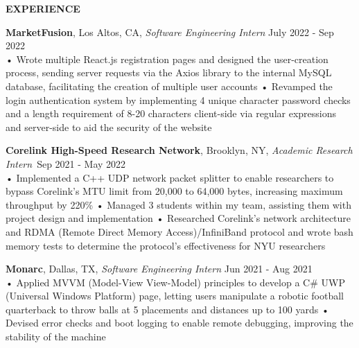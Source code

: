 \documentclass{resume} %
\begin{document}
\begin{rSection}{\textbf{EXPERIENCE}}

\textbf{MarketFusion}, Los Altos, CA, {\emph{Software Engineering Intern}} \hfill July 2022 - Sep 2022 \\
• Wrote multiple React.js registration pages and designed the user-creation process, sending server requests via the Axios library to the internal MySQL database, facilitating the creation of multiple user accounts \newline
• Revamped the login authentication system by implementing 4 unique character password checks and a length requirement of 8-20 characters client-side via regular expressions and server-side to aid the security of the website 

\textbf{Corelink High-Speed Research Network}, Brooklyn, NY, {\emph{Academic Research Intern}}\ \hfill Sep 2021 - May 2022 \\
• Implemented a C++ UDP network packet splitter to enable researchers to bypass Corelink's MTU limit from 20,000 to 64,000 bytes, increasing maximum throughput by 220\% \newline
• Managed 3 students within my team, assisting them with project design and implementation \newline
• Researched Corelink’s network architecture and RDMA (Remote Direct Memory Access)/InfiniBand protocol and wrote bash memory tests to determine the protocol's effectiveness for NYU researchers

\textbf{Monarc}, Dallas, TX, {\emph{Software Engineering Intern}} \hfill Jun 2021 - Aug 2021 \\
• Applied MVVM (Model-View View-Model) principles to develop a C\# UWP (Universal Windows Platform) page, letting users manipulate a robotic football quarterback to throw balls at 5 placements and distances up to 100 yards \newline  %
• Devised error checks and boot logging to enable remote debugging, improving the stability of the machine \smallskip
\end{rSection} 
\end{document}
